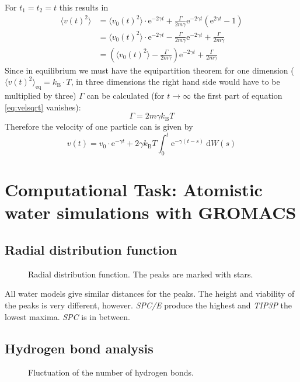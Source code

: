 \documentclass[12pt,a4paper]{scrartcl}
\begin{document}
For $t_1=t_2=t$ this results in
\begin{align}
	\langle v(t)^2\rangle &= \langle v_0(t)^2\rangle \cdot \text{e}^{-2\gamma t}+ \frac{\Gamma}{2 m\gamma} \text{e}^ {-2\gamma t}\left( \text{e}^ {2\gamma t} - 1 \right)\\
	&=\langle v_0(t)^2\rangle \cdot \text{e}^{-2\gamma t} - \frac{\Gamma}{2 m\gamma} \text{e}^ {-2\gamma t} + \frac{\Gamma}{2 m\gamma}\\
	&=\left( \langle v_0(t)^2\rangle - \frac{\Gamma}{2 m\gamma} \right) \text{e}^ {-2\gamma t} + \frac{\Gamma}{2 m\gamma} \label{eq:velsqrt}
\end{align}
Since in equilibrium we must have the equipartition theorem for one dimension ($\langle v(t)^2\rangle_{\text{eq}} = k_\text{B} \cdot T$, in three dimensions the right hand side would have to be multiplied by three) $\Gamma$ can be calculated (for $t \rightarrow \infty$ the first part of equation \ref{eq:velsqrt} vanishes):
\begin{equation}
	\Gamma = 2 m\gamma k_\text{B} T
\end{equation}
Therefore the velocity of one particle can is given by
\begin{equation}
	v(t) = v_0 \cdot \text{e}^{-\gamma t} + 2\gamma k_\text{B} T \int_0^t \text{e}^ {-\gamma(t-s)}~\text{d}W(s)
\end{equation}

\section{Computational Task: Atomistic water simulations with GROMACS}

\subsection{Radial distribution function}
\begin{figure}[H]
	\resizebox{\linewidth}{!}{}
    \caption{Radial distribution function. The peaks are marked with stars.} \label{fig:rdf}
\end{figure}

All water models give similar distances for the peaks. The height and viability of the peaks is very different, however. \textit{SPC/E} produce the highest and \textit{TIP3P} the lowest maxima. \textit{SPC} is in between. 

\subsection{Hydrogen bond analysis}
\begin{figure}[H]
	\resizebox{\linewidth}{!}{}
    \caption{Fluctuation of the number of hydrogen bonds.} \label{fig:hbnum}
\end{figure}
\end{document}
